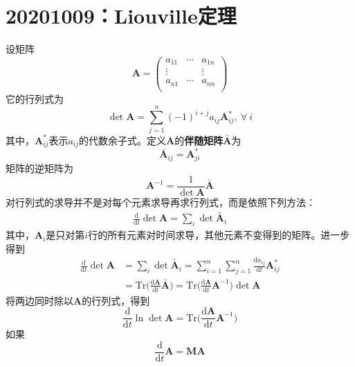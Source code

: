     \section{20201009：Liouville定理}
    设矩阵
    \begin{equation*}
        \bm{A} = 
        \begin{pmatrix}
            a_{11} & \cdots & a_{1n}\\
            \vdots & & \vdots\\
            a_{n1} & \cdots & a_{nn}\\
            \end{pmatrix}
    \end{equation*}
    它的行列式为
    \begin{equation*}
        \det{\bm{A}} = \sum_{j=1}^n (-1)^{i+j} a_{ij} \bm{A}_{ij}^*, \ \forall \ i
    \end{equation*}
    其中，$\bm{A}_{ij}^*$表示$a_{ij}$的代数余子式。定义$\bm{A}$的\textbf{伴随矩阵}$\bar{\bm{A}}$为
    \begin{equation*}
        \bar{\bm{A}}_{ij} = \bm{A}_{ji}^* 
    \end{equation*}
    矩阵的逆矩阵为
    \begin{equation*}
        \bm{A}^{-1} = \frac 1{\det{\bm{A}}} \bm{\bar{A}}
    \end{equation*}
    对行列式的求导并不是对每个元素求导再求行列式，而是依照下列方法：
    \begin{align*}
        \frac {\mathrm{d}}{\mathrm{d}t} \det{\bm{A}} = \sum_i \det{\tilde{\bm{A}_i}}
    \end{align*}
    其中，$\bm{A}_i$是只对第$i$行的所有元素对时间求导，其他元素不变得到的矩阵。进一步得到
    \begin{align*}
        \frac {\mathrm{d}}{\mathrm{d}t} \det{\bm{A}} &= \sum_i \det{\tilde{\bm{A}_i}} = \sum_{i=1}^n \sum_{j=1}^n \frac {\mathrm{d}a_{ij}}{\mathrm{d}t} \bm{A}_{ij}^*\\
        &= \mathrm{Tr} \bigg(\frac {\mathrm{d}\bm{A}}{\mathrm{d}t} \bar{\bm{A}}\bigg) = \mathrm{Tr} \bigg(\frac {\mathrm{d}\bm{A}}{\mathrm{d}t} \bm{A}^{-1}\bigg) \det{\bm{A}}
    \end{align*}
    将两边同时除以$\bm{A}$的行列式，得到
    \begin{equation*}
        \frac {\mathrm{d}}{\mathrm{d}t} \ln{\det{\bm{A}}} = \mathrm{Tr} \bigg(\frac {\mathrm{d}\bm{A}}{\mathrm{d}t} \bm{A}^{-1}\bigg)
    \end{equation*}
    如果
    \begin{equation*}
        \frac {\mathrm{d}}{\mathrm{d}t} \bm{A} = \bm{MA}
    \end{equation*}
